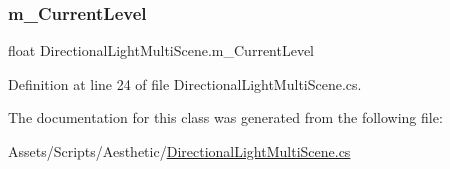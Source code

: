 \subsubsection{\texorpdfstring{m\+\_\+\+Current\+Level}{m\_CurrentLevel}}
{\footnotesize\ttfamily float Directional\+Light\+Multi\+Scene.\+m\+\_\+\+Current\+Level}



Definition at line 24 of file Directional\+Light\+Multi\+Scene.\+cs.



The documentation for this class was generated from the following file\+:\begin{DoxyCompactItemize}
\item 
Assets/\+Scripts/\+Aesthetic/\mbox{\hyperlink{_directional_light_multi_scene_8cs}{Directional\+Light\+Multi\+Scene.\+cs}}\end{DoxyCompactItemize}
